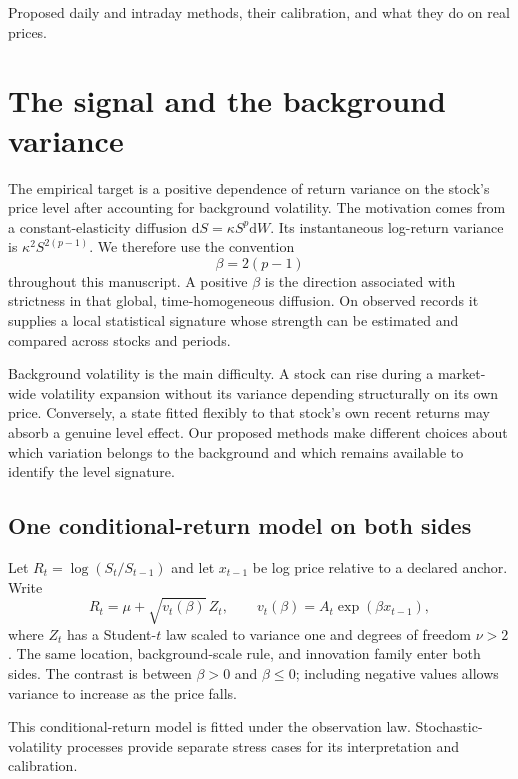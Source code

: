 {Proposed daily and intraday methods, their calibration, and what they do on real prices.}

\section{The signal and the background variance}\label{sec:signaldesign}
The empirical target is a positive dependence of return variance on the
stock's price level after accounting for background volatility. The
motivation comes from a constant-elasticity diffusion
$\mathrm{d}S=\kappa S^p\mathrm{d}W$. Its instantaneous log-return variance is
$\kappa^2 S^{2(p-1)}$. We therefore use the convention
\begin{equation}\label{eq:betaconvention}
 \beta=2(p-1)
\end{equation}
throughout this manuscript. A positive $\beta$ is the direction associated
with strictness in that global, time-homogeneous diffusion. On observed
records it supplies a local statistical signature whose strength can be
estimated and compared across stocks and periods.

Background volatility is the main difficulty. A stock can rise during a
market-wide volatility expansion without its variance depending structurally
on its own price. Conversely, a state fitted flexibly to that stock's own
recent returns may absorb a genuine level effect. Our proposed methods make
different choices about which variation belongs to the background and which
remains available to identify the level signature.

\subsection{One conditional-return model on both sides}
Let $R_t=\log(S_t/S_{t-1})$ and let $x_{t-1}$ be log price relative to a
declared anchor. Write
\begin{equation}\label{eq:sharedmodel}
 R_t=\mu+\sqrt{v_t(\beta)}\,Z_t,
 \qquad v_t(\beta)=A_t\exp(\beta x_{t-1}),
\end{equation}
where $Z_t$ has a Student-$t$ law scaled to variance one and degrees of
freedom $\nu>2$. The same location, background-scale rule, and innovation
family enter both sides. The contrast is between $\beta>0$ and
$\beta\leq0$; including negative values allows variance to increase as the
price falls.

This conditional-return model is fitted under the observation law.
Stochastic-volatility processes provide separate stress cases for its
interpretation and calibration.

